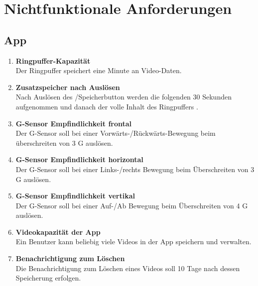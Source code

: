 \chapter{Nichtfunktionale Anforderungen}

\section{\gls{App}}
\begin{enumerate}
\renewcommand{\labelenumi}{\textbf{\theenumi}}
\renewcommand{\theenumi}{NA\arabic{enumi}0}
\setcounter{enumi}{99}
\item \label{na:Ringpuffer} \textbf{\gls{Ringpuffer}-Kapazität} \hfill\\ Der \gls{Ringpuffer} speichert eine Minute an Video-Daten.

\item \textbf{Zusatzspeicher nach Auslösen} \hfill\\ Nach Auslösen des /Speicherbutton werden die folgenden 30 Sekunden aufgenommen und danach der volle Inhalt des Ringpuffers .

\item \label{na:GSensfront}\textbf{\gls{G-Sensor} Empfindlichkeit frontal} \hfill\\  Der \gls{G-Sensor} soll bei einer Vorwärts-/Rückwärts-Bewegung beim überschreiten von 3 G auslösen.

\item \textbf{\gls{G-Sensor} Empfindlichkeit horizontal} \hfill\\  Der \gls{G-Sensor} soll bei einer Links-/rechts Bewegung beim Überschreiten von 3 G auslösen.

\item \label{na:GSensvert}\textbf{\gls{G-Sensor} Empfindlichkeit vertikal} \hfill\\  Der \gls{G-Sensor} soll bei einer Auf-/Ab Bewegung beim Überschreiten von 4 G auslösen.

\item \textbf{Videokapazität der \gls{App}} \hfill\\  Ein Benutzer kann beliebig viele Videos in der \gls{App} speichern und verwalten.

\item \textbf{Benachrichtigung zum Löschen} \hfill\\  Die Benachrichtigung zum Löschen eines Videos soll 10 Tage nach dessen Speicherung erfolgen.
\end{enumerate}

